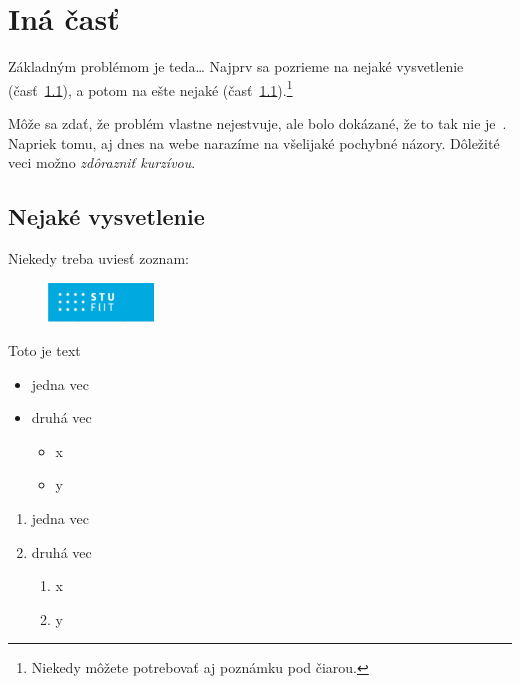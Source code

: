 \documentclass[10pt,twocolumn,twoside,slovak,a4paper]{article}
\begin{document}
\section{Iná časť} \label{ina}

Základným problémom je teda\ldots{} Najprv sa pozrieme na nejaké vysvetlenie (časť~\ref{ina:nejake}), a potom na ešte nejaké (časť~\ref{ina:nejake}).\footnote{Niekedy môžete potrebovať aj poznámku pod čiarou.}

Môže sa zdať, že problém vlastne nejestvuje\cite{Coplien:MPD}, ale bolo dokázané, že to tak nie je~\cite{Czarnecki:Staged, Czarnecki:Progress}. Napriek tomu, aj dnes na webe narazíme na všelijaké pochybné názory\cite{PLP-Framework}. Dôležité veci možno \emph{zdôrazniť kurzívou}.


\subsection{Nejaké vysvetlenie} \label{ina:nejake}

Niekedy treba uviesť zoznam:


\begin{figure}  %
    \vspace{-10pt}  
    \includegraphics[width=0.25\textwidth]{logo_fiit.png}
    \vspace{-10pt}  
\end{figure}

Toto je text

\begin{itemize}
\item jedna vec
\item druhá vec
	\begin{itemize}
	\item x
	\item y
	\end{itemize}
\end{itemize}


\begin{enumerate}
\item jedna vec
\item druhá vec
	\begin{enumerate}
	\item x
	\item y
	\end{enumerate}
\end{enumerate}
\end{document}
